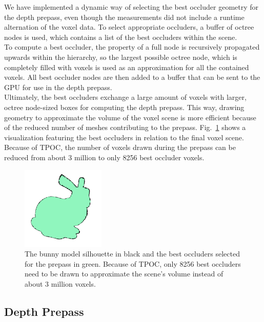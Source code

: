 \documentclass[conference]{IEEEtran}
\begin{document}
\noindent   %
We have implemented a dynamic way of selecting the best occluder geometry for the depth prepass, even 
though the measurements did not include a runtime alternation of the voxel data. To select appropriate 
occluders, a buffer of octree nodes is used, which contains a list of the best occluders within the scene. \\

\noindent
To compute a best occluder, the property of a full node is recursively propagated upwards within the hierarchy, 
so the largest possible octree node, which is completely filled with voxels is used as an approximation for 
all the contained voxels. All best occluder nodes are then added to a buffer that can be sent to the \ac{GPU} for 
use in the depth prepass. \\

\noindent
Ultimately, the best occluders exchange a large amount of voxels with larger, octree node-sized boxes for 
computing the depth prepass. This way, drawing geometry to approximate the volume of the voxel scene is 
more efficient because of the reduced number of meshes contributing to the prepass. 
Fig.~\ref{fig:best-occluder-selection} shows a visualization featuring the best occluders in relation 
to the final voxel scene. Because of \ac{TPOC}, the number of voxels drawn during the prepass can be reduced 
from about 3 million to only 8256 best occluder voxels.

\begin{figure}
    \centering
    \includegraphics[width=150px]{images/bunny-best-occluder-outline.png}
    \caption{The bunny model silhouette in black and the best occluders selected for the prepass in green.
    Because of \ac{TPOC}, only 8256 best occluders need to be drawn to approximate the scene's volume instead of about 3 million voxels.}
    \label{fig:best-occluder-selection}
\end{figure}

\subsection{Depth Prepass} \label{sec-depth-prepass}
\end{document}
